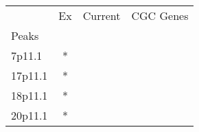 \begin{tabular}{lccr}
\toprule
{} & Ex & Current & CGC Genes \\
Peaks   &    &         &           \\
\midrule
7p11.1  &  * &         &           \\
17p11.1 &  * &         &           \\
18p11.1 &  * &         &           \\
20p11.1 &  * &         &           \\
\bottomrule
\end{tabular}
